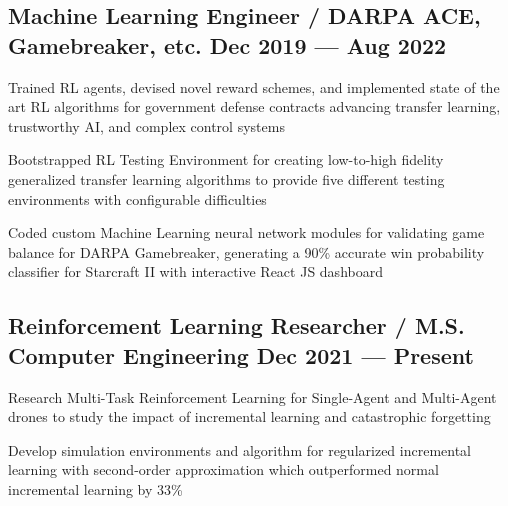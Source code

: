 \subsection{{Machine Learning Engineer / DARPA ACE, Gamebreaker, etc. \hfill Dec 2019 --- Aug 2022}}
\begin{zitemize}
	\item Trained RL agents, devised novel reward schemes, and implemented state of the art RL algorithms for government defense contracts advancing transfer learning, trustworthy AI, and complex
	control systems
	\item Bootstrapped RL Testing Environment for creating low-to-high fidelity generalized transfer learning algorithms
	to provide five different testing environments with configurable difficulties
	\item Coded custom Machine Learning neural network modules for validating game balance for DARPA Gamebreaker, generating a 90\%
	accurate win probability classifier for Starcraft II with interactive React JS dashboard
\end{zitemize}

\subsection{{Reinforcement Learning Researcher / M.S. Computer Engineering  \hfill Dec 2021 --- Present}}
\begin{zitemize}
	\item Research Multi-Task Reinforcement Learning for Single-Agent and Multi-Agent drones to study the impact of incremental learning and catastrophic forgetting
	\item Develop simulation environments and algorithm for regularized incremental learning with second-order approximation which outperformed normal incremental learning by 33\%
\end{zitemize}


